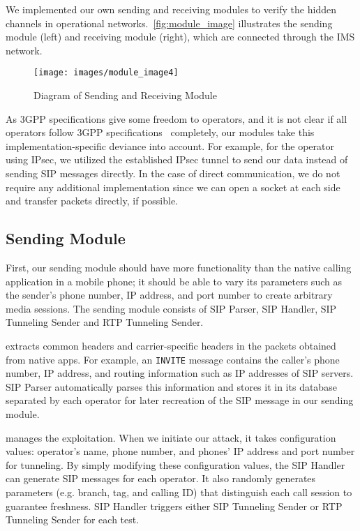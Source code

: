 We implemented our own sending and receiving modules to verify the hidden
channels in operational networks.~\autoref{fig:module_image} illustrates the sending
module (left) and receiving module (right), which are connected through the IMS
network.

\begin{figure*}[h]
  \centering
  \texttt{[image: images/module\_image4]}
  \caption{Diagram of Sending and Receiving Module}
  \label{fig:module_image}
\end{figure*}



As 3GPP specifications give some freedom to operators, and it is not
clear if all operators follow 3GPP specifications~\cite{3gpp_ims,
  gsma_volte} completely, our modules take this
implementation-specific deviance into account. For example, for the
operator using IPsec, we utilized the established IPsec tunnel to send
our data instead of sending SIP messages directly.  In the case of direct
communication, we do not require any additional implementation since we
can open a socket at each side and transfer packets directly, if
possible.

\subsection{Sending Module}
\label{sec:sending_module}

First, our sending module should have more functionality than
the native \vt calling application in a mobile phone; it should be
able to vary its parameters such as the sender's phone number, IP address,
and port number to create arbitrary media sessions. The sending module
consists of SIP Parser, SIP Handler, SIP Tunneling Sender and RTP Tunneling Sender.

 extracts common headers and carrier-specific headers in the
packets obtained from native \vt apps.  For example,
an {\tt INVITE} message contains the caller's phone number, IP address, and routing
information such as IP addresses of SIP servers.  SIP Parser
automatically parses this information and stores it in its database
separated by each operator for later recreation of the SIP message in our
sending module.

 manages the exploitation. When we initiate our
attack, it takes configuration values: operator's name, phone number,
and phones' IP address and port number for tunneling.  By simply
modifying these configuration values, the SIP Handler can generate SIP
messages for each operator.  It also randomly generates
parameters (e.g. branch, tag, and calling ID) that distinguish each call
session to guarantee freshness.  SIP Handler triggers either
SIP Tunneling Sender or RTP Tunneling Sender for each test.

